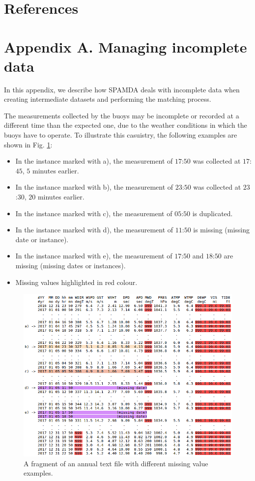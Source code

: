 \documentclass[review]{elsarticle}
\begin{document}
	
	\section*{References}

		

	
	\section*{Appendix A. Managing incomplete data}\label{app:AppendixA}
	
		In this appendix, we describe how SPAMDA deals with incomplete data when creating intermediate datasets and performing the matching process.
		
		The measurements collected by the buoys may be incomplete or recorded at a different time than the expected one, due to the weather conditions in which the buoys have to operate. To illustrate this casuistry, the following examples are shown in Fig. \ref{fig:measurements}:		
		\begin{itemize}
			\item In the instance marked with a), the measurement of $17$:$50$ was collected at $17$:$45$, $5$ minutes earlier.
			\item In the instance marked with b), the measurement of $23$:$50$ was collected at $23$:$30$, $20$ minutes earlier.
			\item In the instance marked with c), the measurement of $05$:$50$ is duplicated.
			\item In the instance marked with d), the measurement of $11$:$50$ is missing (missing date or instance).
			\item In the instance marked with e), the measurement of $17$:$50$ and $18$:$50$ are missing (missing dates or instances).
			\item Missing values highlighted in red colour.
		\end{itemize}
		
		\begin{figure}[ht!]
			\centering
			\includegraphics[scale=0.45]{figures/FigureMeasurements.png}
			\caption{A fragment of an annual text file with different missing value examples.}
			\label{fig:measurements}
		\end{figure}
		
\end{document}
